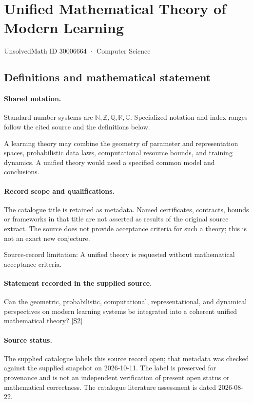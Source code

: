 \documentclass[11pt]{article}
\newcommand{\sref}[2]{\hyperlink{source:#1:#2}{[S#2]}}
\begin{document}
\setcounter{section}{30006663}
\section{Unified Mathematical Theory of Modern Learning}\label{30006664}
{\small\sffamily UnsolvedMath ID 30006664 · Computer Science}
\subsection{Definitions and mathematical statement}

\paragraph{Shared notation.}Standard number systems are $\mathbb N,\mathbb Z,\mathbb Q,\mathbb R,\mathbb C$. Specialized notation and index ranges follow the cited source and the definitions below.


A learning theory may combine the geometry of parameter and representation spaces, probabilistic data laws, computational resource bounds, and training dynamics. A unified theory would need a specified common model and conclusions.
\paragraph{Record scope and qualifications.}
The catalogue title is retained as metadata. Named certificates, contracts, bounds or frameworks in that title are not asserted as results of the original source extract.
The source does not provide acceptance criteria for such a theory; this is not an exact new conjecture.

Source-record limitation: A unified theory is requested without mathematical acceptance criteria.
\paragraph{Statement recorded in the supplied source.}
Can the geometric, probabilistic, computational, representational, and dynamical perspectives on modern learning systems be integrated into a coherent unified mathematical theory? \sref{30006664}{2}
\paragraph{Source status.}
The supplied catalogue labels this source record open; that metadata was checked against the supplied snapshot on 2026-10-11. The label is preserved for provenance and is not an independent verification of present open status or mathematical correctness. The catalogue literature assessment is dated 2026-08-22.
\end{document}
